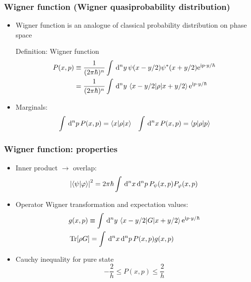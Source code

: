 \documentclass[xcolor=dvipsnames,hyperref={CJKbookmarks=true},aspectratio=169]{beamer}
\newcommand{\dif}{\,\mathrm d}
\newcommand\mi{\mathrm{i}}
\newcommand\e{\mathrm{e}}
\DeclareMathOperator{\Tr}{Tr}
\begin{document}
\begin{frame}[t]\frametitle{Wigner function (Wigner quasiprobability distribution)}
\begin{itemize}
	\item Wigner function is an analogue of classical probability distribution 
	on phase space
	\begin{block}{Definition: Wigner function}
	\begin{align*}
		P(x, p) &\equiv \frac{1}{(2\pi\hbar)^n}\int\dif^n y \,
		    \psi(x-y/2)\psi^*(x+y/2) \e^{\mi p\cdot y/\hbar} \\
		&= \frac{1}{(2\pi\hbar)^n}\int\dif^n y\, 
			\braket{x-y/2|\rho|x+y/2} \e^{\mi p\cdot y/\hbar}
	\end{align*}
	\end{block}
	\item Marginals: 
	\begin{align*}
		&\int\dif^n p\, P(x,p) = \braket{x|\rho|x} 
		&\int\dif^n x\, P(x,p) = \braket{p|\rho|p}
	\end{align*}
\end{itemize}
\end{frame}

\begin{frame}[t]\frametitle{Wigner function: properties}
\begin{itemize}
	\item Inner product $\rightarrow$ overlap: 
	$$
	  \left|\braket{\psi|\varphi}\right|^2 = 2\pi\hbar \int\dif^n x\dif^n p \,
	  P_\psi(x,p) P_\varphi(x,p)
	$$
	\item Operator Wigner transformation and expectation values: 
	\begin{align*}
		&g(x,p) \equiv \int\dif^n y \, \braket{x-y/2|G|x+y/2}
		\e^{\mi p\cdot y/\hbar} \\
		&\Tr [\rho G] = \int\dif^n x\dif^n p\, P(x,p)g(x,p)
	\end{align*}
	\item Cauchy inequality for pure state
	$$
	 -\frac 2h \le P(x,p) \le \frac 2h
	$$
\end{itemize}
\end{frame}
\end{document}
